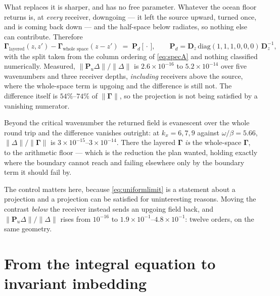 \documentclass[11pt,a4paper]{article}
\newcommand{\bP}{\mathbf{P}}
\begin{document}
What replaces it is sharper, and has no free parameter.  Whatever the ocean
floor returns is, at \emph{every} receiver, downgoing --- it left the source
upward, turned once, and is coming back down --- and the half-space below
radiates, so nothing else can contribute.  Therefore
\begin{equation}\label{eq:uniformlimit}
  \boldsymbol\Gamma_{\text{layered}}(z,z') -
  \boldsymbol\Gamma_{\text{whole space}}(z-z')
  \;=\; \bP_{d}\,\bigl[\,\cdot\,\bigr],
  \qquad
  \bP_{d} = \mathbf{D}_z\,\mathrm{diag}(1,1,1,0,0,0)\,\mathbf{D}_z^{-1},
\end{equation}
with the split taken from the column ordering of \eqref{eq:specA} and nothing
classified numerically.  Measured, $\|\bP_u\Delta\|/\|\Delta\|$ is
$2.6\times10^{-16}$ to $5.2\times10^{-14}$ over five wavenumbers and three
receiver depths, \emph{including} receivers above the source, where the
whole-space term is upgoing and the difference is still not.  The difference
itself is $54\%$--$74\%$ of $\|\boldsymbol\Gamma\|$, so the projection is not
being satisfied by a vanishing numerator.

Beyond the critical wavenumber the returned field is evanescent over the whole
round trip and the difference vanishes outright: at $k_x = 6,7,9$ against
$\omega/\beta = 5.66$, $\|\Delta\|/\|\boldsymbol\Gamma\|$ is
$3\times10^{-15}$--$3\times10^{-14}$.  There the layered $\boldsymbol\Gamma$
\emph{is} the whole-space $\boldsymbol\Gamma$, to the arithmetic floor --- which
is the reduction the plan wanted, holding exactly where the boundary cannot
reach and failing elsewhere only by the boundary term it should fail by.

The control matters here, because \eqref{eq:uniformlimit} is a statement about a
projection and a projection can be satisfied for uninteresting reasons.  Moving
the contrast \emph{below} the receiver instead sends an upgoing field back, and
$\|\bP_u\Delta\|/\|\Delta\|$ rises from $10^{-16}$ to
$1.9\times10^{-1}$--$4.8\times10^{-1}$: twelve orders, on the same geometry.

\section{From the integral equation to invariant
imbedding}\label{sec:imbedding}
\end{document}
